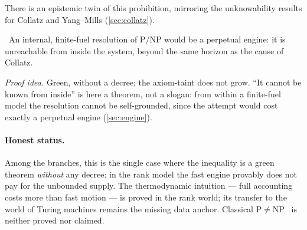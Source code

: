 There is an epistemic twin of this prohibition, mirroring the unknowability results for Collatz and
Yang--Mills (\cref{sec:collatz}).

\begin{theorem}\label{thm:pnpCause_unknowable}
\green{}\ An internal, finite-fuel resolution of $\mathrm{P}/\mathrm{NP}$ would be a perpetual
engine: it is unreachable from inside the system, beyond the same horizon as the cause of Collatz.
\end{theorem}

\emph{Proof idea.} Green, without a decree; the axiom-taint does not grow. ``It cannot be known
from inside'' is here a theorem, not a slogan: from within a finite-fuel model the resolution
cannot be self-grounded, since the attempt would cost exactly a perpetual engine
(\cref{sec:engine}).

\paragraph{Honest status.}
Among the branches, this is the single case where the inequality is a green theorem \emph{without}
any decree: in the rank model the fast engine provably does not pay for the unbounded supply. The
thermodynamic intuition --- full accounting costs more than fast motion --- is proved in the rank
world; its transfer to the world of Turing machines remains the missing data anchor. Classical
$\mathrm{P}\neq\mathrm{NP}$~\cite{clay-pnp} is neither proved nor claimed.
